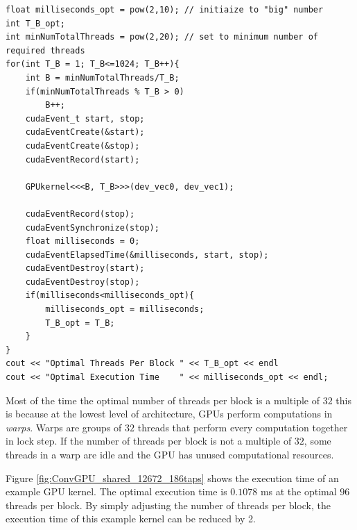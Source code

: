\singlespacing
\clearpage
\begin{lstlisting}[style=myCUDAstyle,caption={Code snippet for thread optimization.},label={code:threadTiming}]
float milliseconds_opt = pow(2,10); // initiaize to "big" number
int T_B_opt;
int minNumTotalThreads = pow(2,20); // set to minimum number of required threads
for(int T_B = 1; T_B<=1024; T_B++){
	int B = minNumTotalThreads/T_B;
	if(minNumTotalThreads % T_B > 0)
		B++;
	cudaEvent_t start, stop;
	cudaEventCreate(&start);
	cudaEventCreate(&stop);
	cudaEventRecord(start);
	
	GPUkernel<<<B, T_B>>>(dev_vec0, dev_vec1);
	
	cudaEventRecord(stop);
	cudaEventSynchronize(stop);
	float milliseconds = 0;
	cudaEventElapsedTime(&milliseconds, start, stop);
	cudaEventDestroy(start);
	cudaEventDestroy(stop);
	if(milliseconds<milliseconds_opt){
		milliseconds_opt = milliseconds;
		T_B_opt = T_B;
	}
}
cout << "Optimal Threads Per Block " << T_B_opt << endl
cout << "Optimal Execution Time    " << milliseconds_opt << endl;
\end{lstlisting}
\doublespacing

Most of the time the optimal number of threads per block is a multiple of $32$ this is because
at the lowest level of architecture, GPUs perform computations in \textit{warps}.
Warps are groups of $32$ threads that perform every computation together in lock step.
If the number of threads per block is not a multiple of $32$, some threads in a warp are idle and the GPU has unused computational resources.

Figure \ref{fig:ConvGPU_shared_12672_186taps} shows the execution time of an example GPU kernel.
The optimal execution time is $0.1078$ ms at the optimal $96$ threads per block.
By simply adjusting the number of threads per block, the execution time of this example kernel can be reduced by 2.

